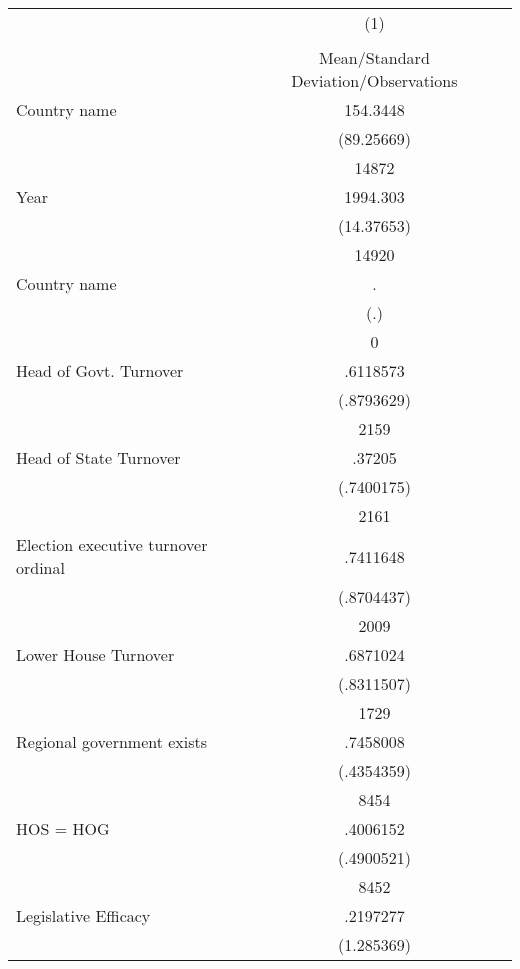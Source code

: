 {
\def\sym#1{\ifmmode^{#1}\else\(^{#1}\)\fi}
\begin{tabular}{l*{1}{c}}
\hline\hline
                    &\multicolumn{1}{c}{(1)}\\
                    &\multicolumn{1}{c}{}\\
                    &Mean/Standard Deviation/Observations\\
\hline
Country name        &    154.3448\\
                    &  (89.25669)\\
                    &       14872\\
Year                &    1994.303\\
                    &  (14.37653)\\
                    &       14920\\
Country name        &           .\\
                    &         (.)\\
                    &           0\\
Head of Govt. Turnover&    .6118573\\
                    &  (.8793629)\\
                    &        2159\\
Head of State Turnover&      .37205\\
                    &  (.7400175)\\
                    &        2161\\
Election executive turnover ordinal&    .7411648\\
                    &  (.8704437)\\
                    &        2009\\
Lower House Turnover&    .6871024\\
                    &  (.8311507)\\
                    &        1729\\
Regional government exists   &    .7458008\\
                    &  (.4354359)\\
                    &        8454\\
HOS = HOG           &    .4006152\\
                    &  (.4900521)\\
                    &        8452\\
Legislative Efficacy&    .2197277\\
                    &  (1.285369)\\

\end{tabular}}
